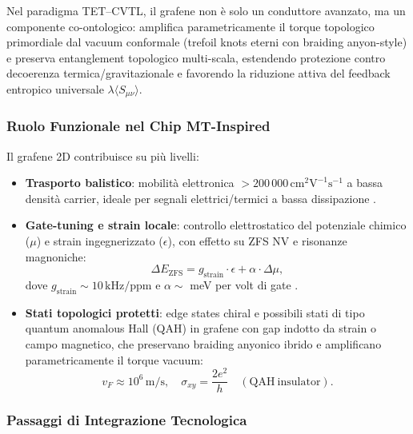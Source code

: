 \documentclass[12pt,a4paper]{article}
\begin{document}
Nel paradigma TET--CVTL, il grafene non è solo un conduttore avanzato, ma un componente co-ontologico: amplifica parametricamente il torque topologico primordiale dal vacuum conformale (trefoil knots eterni con braiding anyon-style) e preserva entanglement topologico multi-scala, estendendo protezione contro decoerenza termica/gravitazionale e favorendo la riduzione attiva del feedback entropico universale $\lambda \langle S_{\mu\nu} \rangle$.

\subsubsection{Ruolo Funzionale nel Chip MT-Inspired}

Il grafene 2D contribuisce su più livelli:
\begin{itemize}
    \item \textbf{Trasporto balistico}: mobilità elettronica $>200\,000\,\mathrm{cm}^2\mathrm{V}^{-1}\mathrm{s}^{-1}$ a bassa densità carrier, ideale per segnali elettrici/termici a bassa dissipazione \cite{Geim2012, Novoselov2015}.
    \item \textbf{Gate-tuning e strain locale}: controllo elettrostatico del potenziale chimico ($\mu$) e strain ingegnerizzato ($\epsilon$), con effetto su ZFS NV e risonanze magnoniche:
    \begin{equation}
    \Delta E_{\mathrm{ZFS}} = g_{\mathrm{strain}} \cdot \epsilon + \alpha \cdot \Delta \mu,
    \label{eq:graphene_tuning}
    \end{equation}
    dove $g_{\mathrm{strain}} \sim 10\,\mathrm{kHz}/\mathrm{ppm}$ e $\alpha \sim$ meV per volt di gate \cite{Lee2018, Ku2019}.
    \item \textbf{Stati topologici protetti}: edge states chiral e possibili stati di tipo quantum anomalous Hall (QAH) in grafene con gap indotto da strain o campo magnetico, che preservano braiding anyonico ibrido e amplificano parametricamente il torque vacuum:
    \begin{equation}
    v_F \approx 10^6\,\mathrm{m/s}, \quad \sigma_{xy} = \frac{2e^2}{h} \quad (\mathrm{QAH\ insulator}).
    \label{eq:topological_graphene}
    \end{equation}
\end{itemize}

\subsubsection{Passaggi di Integrazione Tecnologica}
\end{document}
